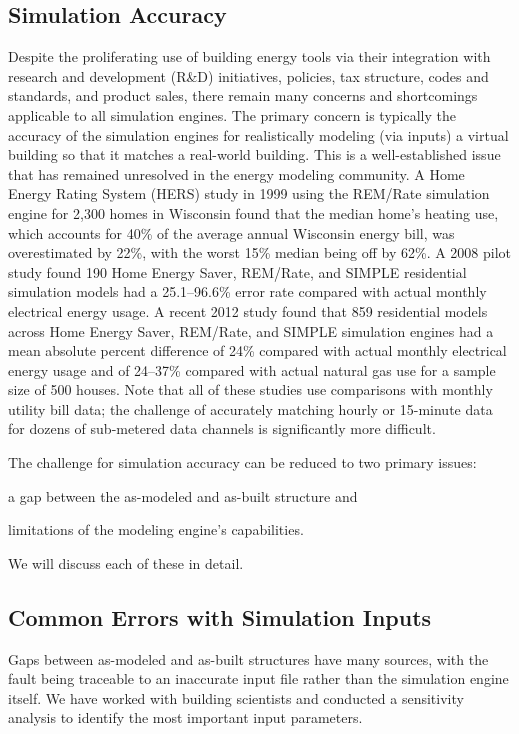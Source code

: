 \documentclass[preprint, review, 12pt]{elsarticle}
\begin{document}
\subsection{Simulation Accuracy}
Despite the proliferating use of building energy tools via their integration with research and development (R\&D) initiatives, policies, tax structure, codes and standards, and product sales, there remain many concerns and shortcomings applicable to all simulation engines. The primary concern is typically the accuracy of the simulation engines for realistically modeling (via inputs) a virtual building so that it matches a real-world building. This is a well-established issue that has remained unresolved in the energy modeling community. A Home Energy Rating System (HERS) study in 1999 \cite{cit:pigg2001} using the REM/Rate
simulation engine for 2,300 homes in Wisconsin found that the median home's heating use, which accounts for 40\% of the average annual Wisconsin energy bill, was overestimated by 22\%, with the worst 15\% median being off by 62\%. A 2008 pilot study \cite{cit:earthadvantage2009} found 190 Home Energy Saver, REM/Rate, and SIMPLE residential simulation models had a 25.1--96.6\% error rate compared with actual monthly electrical energy usage. A recent 2012 study \cite{cit:roberts2012} found that 859 residential models across Home Energy Saver, REM/Rate, and SIMPLE simulation engines had a mean absolute percent difference of 24\% compared with actual monthly electrical energy usage and of 24--37\% compared with actual natural gas use for a sample size of 500 houses. Note that all of these studies use comparisons with monthly utility bill data; the challenge of accurately matching hourly or 15-minute data for dozens of sub-metered data channels is significantly more difficult.

The challenge for simulation accuracy can be reduced to two primary issues: \begin{inparaenum}[(1)]
\item a gap between the as-modeled and as-built structure and 
\item limitations of the modeling engine's capabilities. %
\end{inparaenum}
We will discuss each of these in detail.

\subsection{Common Errors with Simulation Inputs}
Gaps between as-modeled and as-built structures have many sources, with the fault being traceable to an inaccurate input file rather than the simulation engine itself. We have worked with building scientists and conducted a sensitivity analysis to identify the most important input parameters.
\end{document}
